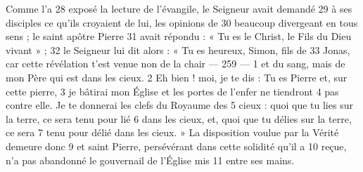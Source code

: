 Comme l'a	 
28	 	exposé la lecture de l'évangile, le Seigneur avait demandé	 
29	 	à ses disciples ce qu'ils croyaient de lui, les opinions de	 
30	 	beaucoup divergeant en tous sens ; le saint apôtre Pierre	 
31	 	avait répondu : « Tu es le Christ, le Fils du Dieu vivant » ;	 
32	 	le Seigneur lui dit alors : « Tu es heureux, Simon, fils de	 
33	 	Jonas, car cette révélation t'est venue non de la chair	 
 	--- 259 ---	 
1	 	et du sang, mais de mon Père qui est dans les cieux.	 
2	 	Eh bien ! moi, je te dis : Tu es Pierre et, sur cette pierre,	 
3	 	je bâtirai mon Église et les portes de l'enfer ne tiendront	 
4	 	pas contre elle. Je te donnerai les clefs du Royaume des	 
5	 	cieux : quoi que tu lies sur la terre, ce sera tenu pour lié	 
6	 	dans les cieux, et, quoi que tu délies sur la terre, ce sera	 
7	 	tenu pour délié dans les cieux. »
La disposition voulue par la Vérité demeure donc	 
9	 	et saint Pierre, persévérant dans cette solidité qu'il a	 
10	 	reçue, n'a pas abandonné le gouvernail de l'Église mis	 
11	 	entre ses mains.
